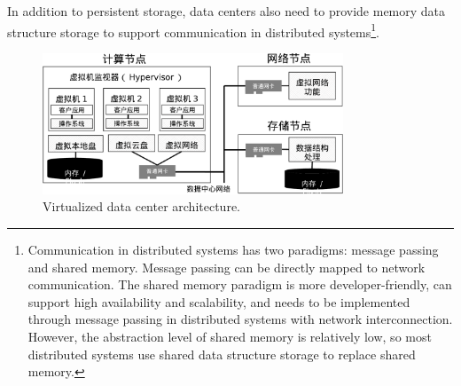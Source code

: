 In addition to persistent storage, data centers also need to provide memory data structure storage to support communication in distributed systems\footnote{Communication in distributed systems has two paradigms: message passing and shared memory. Message passing can be directly mapped to network communication. The shared memory paradigm is more developer-friendly, can support high availability and scalability, and needs to be implemented through message passing in distributed systems with network interconnection. However, the abstraction level of shared memory is relatively low, so most distributed systems use shared data structure storage to replace shared memory.}.

\begin{figure}[htbp]
	\centering
	\includegraphics[width=0.8\textwidth]{figures/virt_arch.pdf}
	\caption{Virtualized data center architecture.}
	\label{intro:fig:virt-architecture}
\end{figure}

